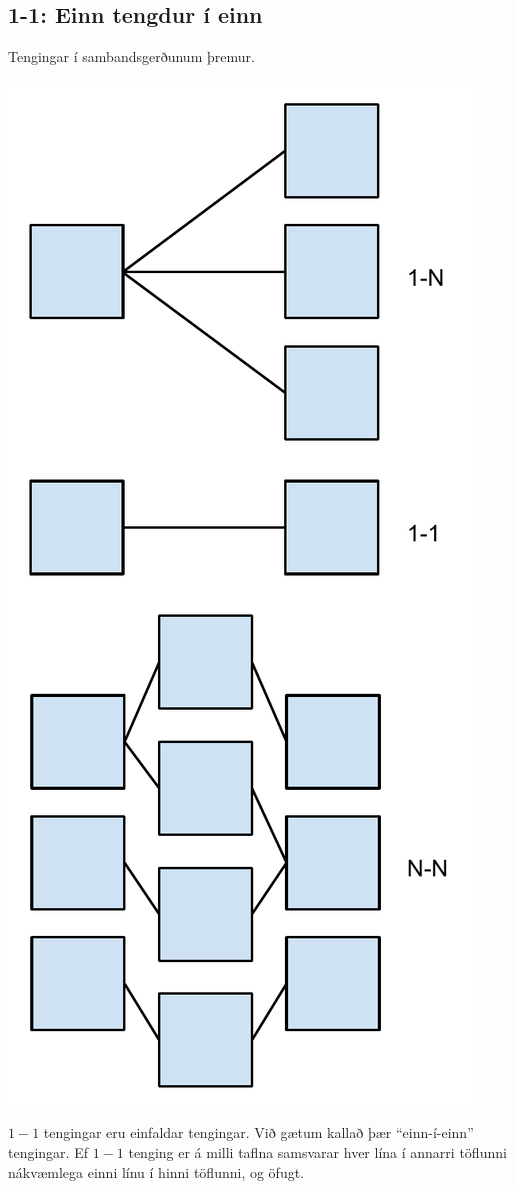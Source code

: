 \subsection{1-1: Einn tengdur í einn}
\begin{marginfigure}[8cm]
\caption[Sambandsgerðir]{Tengingar í sambandsgerðunum þremur.}
\label{mynd:tengingar}
\centering
\includegraphics[width=\linewidth]{myndir/tengingar}
\end{marginfigure}
$1-1$ tengingar eru einfaldar tengingar. Við gætum kallað þær ``einn-í-einn'' tengingar. Ef $1-1$ tenging er á milli taflna samsvarar hver lína í annarri töflunni nákvæmlega einni línu í hinni töflunni, og öfugt.

